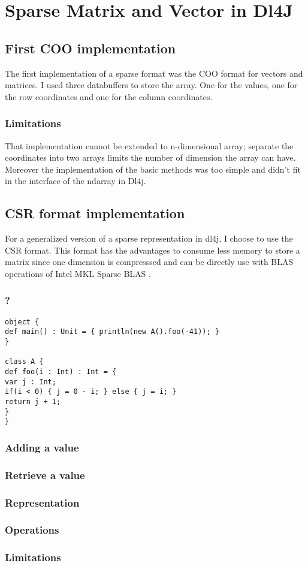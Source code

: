 \chapter{Sparse Matrix and Vector in Dl4J}

\section{First COO implementation}

The first implementation of a sparse format was the COO format for vectors and matrices. I used three databuffers to store the array. One for the values, one for the row coordinates and one for the column coordinates.

\subsection{Limitations}
That implementation cannot be extended to n-dimensional array; separate the coordinates into two arrays limits the number of dimension the array can have.
Moreover the implementation of the basic methods was too simple and didn't fit in the interface of the ndarray in Dl4j.

\section{CSR format implementation}

For a generalized version of a sparse representation in dl4j, I choose to use the CSR format. This format has the advantages to consume less memory to store a matrix since one dimension is compresssed and can be directly use with BLAS operations of Intel MKL Sparse BLAS \cite{mklFormat}.

\subsection{?}

\begin{lstlisting}
object {
def main() : Unit = { println(new A().foo(-41)); }
}

class A {
def foo(i : Int) : Int = {
var j : Int;
if(i < 0) { j = 0 - i; } else { j = i; }
return j + 1;
}
}
\end{lstlisting}

\subsection{Adding a value}
\subsection{Retrieve a value}

\subsection{Representation}
\subsection{Operations}
\subsection{Limitations}